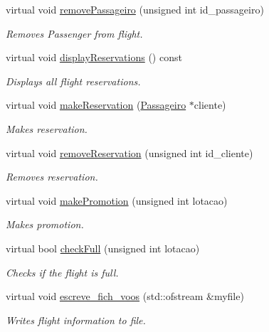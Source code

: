 \begin{DoxyCompactItemize}
virtual void \hyperlink{class_voo_ad0c67dc3c01f30746e150f26d5bf15ac}{remove\+Passageiro} (unsigned int id\+\_\+passageiro)
\begin{DoxyCompactList}\small\item\em Removes Passenger from flight. \end{DoxyCompactList}\item 
\mbox{\label{class_voo_a826778647ec8930a3b31fde584e7acdc}} 
virtual void \hyperlink{class_voo_a826778647ec8930a3b31fde584e7acdc}{display\+Reservations} () const
\begin{DoxyCompactList}\small\item\em Displays all flight reservations. \end{DoxyCompactList}\item 
virtual void \hyperlink{class_voo_aa308fcf651fdf54b0a03e881c6d8fea4}{make\+Reservation} (\hyperlink{class_passageiro}{Passageiro} $\ast$cliente)
\begin{DoxyCompactList}\small\item\em Makes reservation. \end{DoxyCompactList}\item 
virtual void \hyperlink{class_voo_ab9b59a39248b92a5f106800117436d90}{remove\+Reservation} (unsigned int id\+\_\+cliente)
\begin{DoxyCompactList}\small\item\em Removes reservation. \end{DoxyCompactList}\item 
virtual void \hyperlink{class_voo_abe4f7816ae9132314e0288e7b8a077d8}{make\+Promotion} (unsigned int lotacao)
\begin{DoxyCompactList}\small\item\em Makes promotion. \end{DoxyCompactList}\item 
virtual bool \hyperlink{class_voo_ae8c7d7254ca23ed23f762a9b867aba91}{check\+Full} (unsigned int lotacao)
\begin{DoxyCompactList}\small\item\em Checks if the flight is full. \end{DoxyCompactList}\item 
virtual void \hyperlink{class_voo_a3268d6d5ac51e31ebbdb11fd637544c1}{escreve\+\_\+fich\+\_\+voos} (std\+::ofstream \&myfile)
\begin{DoxyCompactList}\small\item\em Writes flight information to file. \end{DoxyCompactList}\end{DoxyCompactItemize}
